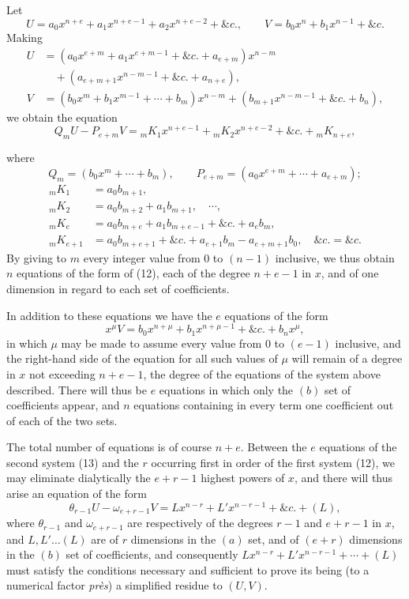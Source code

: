 \documentclass[11pt]{article}
\newcommand{\sourcepage}[1]{\marginpar{\scriptsize p.~#1}}
\begin{document}
Let
\[
U=a_0x^{n+e}+a_1x^{n+e-1}+a_2x^{n+e-2}+\&c.,
\qquad
V=b_0x^n+b_1x^{n-1}+\&c.
\]
Making
\[
\begin{aligned}
U&=(a_0x^{e+m}+a_1x^{e+m-1}+\&c.+a_{e+m})x^{n-m}\\
&\quad +(a_{e+m+1}x^{n-m-1}+\&c.+a_{n+e}),\\
V&=(b_0x^m+b_1x^{m-1}+\cdots+b_m)x^{n-m}
 +(b_{m+1}x^{n-m-1}+\&c.+b_n),
\end{aligned}
\]
we obtain the equation
\[
Q_mU-P_{e+m}V={}_mK_1x^{n+e-1}+{}_mK_2x^{n+e-2}+\&c.+{}_mK_{n+e},
\tag{12}
\]

\sourcepage{446}
where
\[
Q_m=(b_0x^m+\cdots+b_m),\qquad
P_{e+m}=(a_0x^{e+m}+\cdots+a_{e+m});
\]
\[
\begin{aligned}
{}_mK_1&=a_0b_{m+1},\\
{}_mK_2&=a_0b_{m+2}+a_1b_{m+1},\quad \cdots,\\
{}_mK_e&=a_0b_{m+e}+a_1b_{m+e-1}+\&c.+a_eb_m,\\
{}_mK_{e+1}&=a_0b_{m+e+1}+\&c.+a_{e+1}b_m-a_{e+m+1}b_0,\quad \&c.=\&c.
\end{aligned}
\]
By giving to $m$ every integer value from 0 to $(n-1)$ inclusive, we thus obtain $n$ equations of the form of (12), each of the degree $n+e-1$ in $x$, and of one dimension in regard to each set of coefficients.

In addition to these equations we have the $e$ equations of the form
\[
x^\mu V=b_0x^{n+\mu}+b_1x^{n+\mu-1}+\&c.+b_nx^\mu,
\tag{13}
\]
in which $\mu$ may be made to assume every value from 0 to $(e-1)$ inclusive, and the right-hand side of the equation for all such values of $\mu$ will remain of a degree in $x$ not exceeding $n+e-1$, the degree of the equations of the system above described. There will thus be $e$ equations in which only the $(b)$ set of coefficients appear, and $n$ equations containing in every term one coefficient out of each of the two sets.

The total number of equations is of course $n+e$. Between the $e$ equations of the second system (13) and the $r$ occurring first in order of the first system (12), we may eliminate dialytically the $e+r-1$ highest powers of $x$, and there will thus arise an equation of the form
\[
\theta_{r-1}U-\omega_{e+r-1}V
=Lx^{n-r}+L'x^{n-r-1}+\&c.+(L),
\tag{14}
\]
where $\theta_{r-1}$ and $\omega_{e+r-1}$ are respectively of the degrees $r-1$ and $e+r-1$ in $x$, and $L,L'\ldots(L)$ are of $r$ dimensions in the $(a)$ set, and of $(e+r)$ dimensions in the $(b)$ set of coefficients, and consequently $Lx^{n-r}+L'x^{n-r-1}+\cdots+(L)$ must satisfy the conditions necessary and sufficient to prove its being (to a numerical factor \emph{près}) a simplified residue to $(U,V)$.
\end{document}
